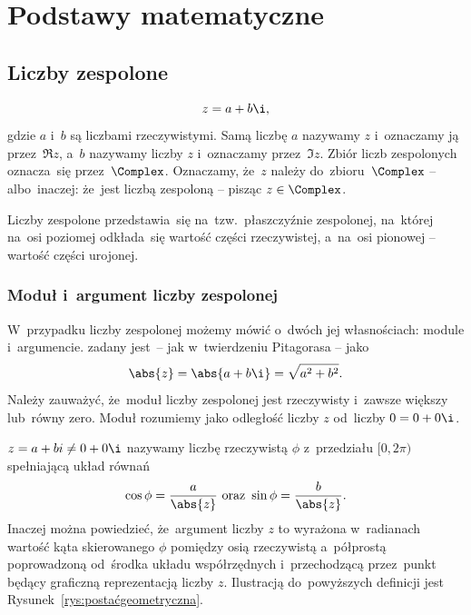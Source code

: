 \mode*
{}
\section{Podstawy matematyczne}
\subsection{Liczby zespolone}
$$
z = a + b \i,
$$
gdzie $a$ i~$b$ są liczbami rzeczywistymi. Samą liczbę $a$ nazywamy
 $z$
i~oznaczamy ją przez~$\Re z$, a~$b$ nazywamy 
 liczby $z$ i~oznaczamy przez~$\Im z$.
Zbiór liczb zespolonych oznacza~się przez~$\Complex$. Oznaczamy, że~$z$ należy
do~zbioru~$\Complex$ -- albo~inaczej: że~jest liczbą zespoloną -- pisząc
$z\in\Complex$.



Liczby zespolone przedstawia~się na~tzw.~płaszczyźnie zespolonej, na~której
na~osi poziomej odkłada~się wartość części rzeczywistej, a~na~osi pionowej --
wartość części urojonej.

\subsubsection{Moduł i~argument liczby zespolonej}
W~przypadku liczby zespolonej możemy mówić o~dwóch jej własnościach: module i~argumencie.
 zadany jest~-- jak
w~twierdzeniu Pitagorasa -- jako
$$
	\abs{z} = \abs{a+b\i} = \sqrt{a^2+b^2}.
$$
Należy zauważyć, że~moduł liczby zespolonej jest rzeczywisty i~zawsze większy lub~równy
zero. Moduł rozumiemy jako odległość liczby $z$ od~liczby $0=0+0\i$.

$z = a + bi \neq 0 + 0\i$ nazywamy liczbę rzeczywistą $\phi$ z~przedziału $[0,2\pi)$ spełniającą układ równań
$$
	\cos \phi = \frac{a}{\abs{z}}  \text{ oraz }   \sin \phi=\frac{b}{\abs{z}}.
$$
Inaczej można powiedzieć, że~argument liczby $z$ to wyrażona w~radianach wartość
kąta skierowanego $\phi$ pomiędzy osią rzeczywistą a~półprostą poprowadzoną od~środka układu
współrzędnych i~przechodzącą przez~punkt będący graficzną reprezentacją liczby $z$.
Ilustracją do~powyższych definicji jest Rysunek~\ref{rys:postaćgeometryczna}.

